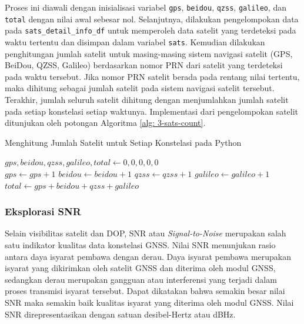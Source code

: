 Proses ini diawali dengan inisialisasi variabel \texttt{gps}, \texttt{beidou}, \texttt{qzss}, \texttt{galileo}, dan \texttt{total} dengan nilai awal sebesar nol. Selanjutnya, dilakukan pengelompokan data pada \texttt{sats\_detail\_info\_df} untuk memperoleh data satelit yang terdeteksi pada waktu tertentu dan disimpan dalam variabel \texttt{sats}. Kemudian dilakukan penghitungan jumlah satelit untuk masing-masing sistem navigasi satelit (GPS, BeiDou, QZSS, Galileo) berdasarkan nomor PRN dari satelit yang terdeteksi pada waktu tersebut. Jika nomor PRN satelit berada pada rentang nilai tertentu, maka dihitung sebagai jumlah satelit pada sistem navigasi satelit tersebut. Terakhir, jumlah seluruh satelit dihitung dengan menjumlahkan jumlah satelit pada setiap konstelasi setiap waktunya. Implementasi dari pengelompokan satelit ditunjukan oleh potongan Algoritma \ref{alg: 3-sats-count}.

\begin{algorithm}[H]
	\caption{Menghitung Jumlah Satelit untuk Setiap Konstelasi pada Python}
	\label{alg: 3-sats-count}
	\begin{algorithmic}[1]
	\State $gps, beidou, qzss, galileo, total \gets 0, 0, 0, 0, 0$
	\\
	\State $gps \gets gps + 1$
	\EndIf
	\State $beidou \gets beidou + 1$
	\EndIf
	\State $qzss \gets qzss + 1$
	\EndIf
	\State $galileo \gets galileo + 1$
	\EndIf
	\State $total \gets gps + beidou + qzss + galileo$
	\EndFor
	\EndFor
	\end{algorithmic}
\end{algorithm}

\iffalse
\subsubsection{Eksplorasi SNR}
Selain visibilitas satelit dan DOP, SNR atau \textit{Signal-to-Noise} merupakan salah satu indikator kualitas data konstelasi GNSS. Nilai SNR menunjukan rasio antara daya isyarat pembawa dengan derau. Daya isyarat pembawa merupakan isyarat yang dikirimkan oleh satelit GNSS dan diterima oleh modul GNSS, sedangkan derau merupakan gangguan atau interferensi yang terjadi dalam proses transmisi isyarat tersebut. Dapat dikatakan bahwa semakin besar nilai SNR maka semakin baik kualitas isyarat yang diterima oleh modul GNSS. Nilai SNR direpresentasikan dengan satuan desibel-Hertz atau dBHz.

